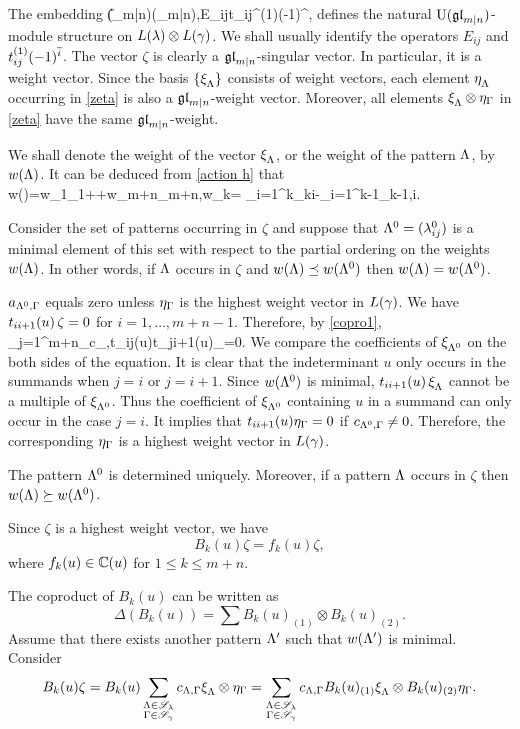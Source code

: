 \documentclass[12pt]{amsart}
\begin{document}
The embedding
\U(\gl_{m|n})\hookrightarrow\Y(\gl_{m|n}),\qquad E_{ij}\mapsto t_{ij}^{(1)}(-1)^{},
\eeq
defines the natural
${\rm U}(\mathfrak{gl}_{m|n})$-module  structure
on $L(\lambda)\otimes L(\gamma)$. We shall usually identify the operators
$E_{ij}$ and $t_{ij}^{(1)}(-1)^{\overline{i}}$.
The vector $\zeta$ is clearly a $\mathfrak{gl}_{m|n}$-singular vector. In particular,
it is a weight vector. Since the basis $\{\xi^{}_{\Lambda}\}$ consists of
weight vectors, each element $\eta^{}_{\Lambda}$ occurring in \eqref{zeta} is also
a $\mathfrak{gl}_{m|n}$-weight vector. Moreover, all elements $\xi^{}_{\Lambda}\otimes\eta_{\Gamma}$ in \eqref{zeta} have
the same $\mathfrak{gl}_{m|n}$-weight.

We shall denote the weight of the vector $\xi^{}_{\Lambda}$, or the weight
of the pattern $\Lambda$, by $w(\Lambda)$.
It can be deduced from \eqref{action h} that
w(\La)=w_1\ve_1+\cdots+w_{m+n}\ve_{m+n},\qquad w_k=
\sum_{i=1}^k\la_{ki}-\sum_{i=1}^{k-1}\la_{k-1,i}.
\eeq

Consider the set of patterns occurring in $\zeta$
and suppose that $\Lambda^0=(\lambda_{ij}^0)$ is a minimal element of this set with respect to the
partial ordering on the weights $w(\Lambda)$. In other words, if $\Lambda$ occurs in $\zeta$
and $w(\Lambda)\preceq w(\Lambda^0)$
then $w(\Lambda)=w(\Lambda^0)$.

\ble\label{lem:ga0}
$a_{\Lambda^0,\Gamma}$ equals zero unless $\eta_{\Gamma}$ is the highest weight vector in $L(\gamma)$.
\ele
\bpf
We have $t_{ii+1}(u)\,\zeta=0$ for $i=1,\dots,m+n-1$. Therefore, by
\eqref{copro1},
\sum_{j=1}^{m+n}\sum_{}c_{\La,\Ga}t_{ij}(u)\xiL\ot t_{ji+1}(u)\eta_{\Ga}=0.
\eeq
We compare the coefficients of $\xi^{}_{\Lambda^0}$ on the both sides of the equation. It is clear that the indeterminant $u$  only occurs in the summands when $j=i$ or $j=i+1$. Since $w(\Lambda^0)$ is minimal, $t_{ii+1}(u)\,\xi^{}_{\Lambda}$ cannot be a multiple of $\xi^{}_{\Lambda^0}$. Thus the coefficient of $\xi^{}_{\Lambda^0}$ containing $u$ in a summand can only occur in the case  $j=i$. It implies that $t_{ii+1}(u)\eta_{\Gamma}=0$ if $c_{\Lambda^0,\Gamma}\neq 0$. Therefore, the corresponding $\eta_{\Gamma}$ is a highest weight vector in $L(\gamma)$.
\epf

\ble\label{lem:uni}
The pattern $\Lambda^0$ is determined uniquely.
Moreover, if a pattern $\Lambda$ occurs in $\zeta$
then $w(\Lambda)\succeq w(\Lambda^0)$.
\ele
\bpf

Since $\zeta$ is a highest weight vector, we have
\[
B_k(u)\zeta=f_k(u)\zeta,
\]
where $f_k(u)\in \mathbb{C}(u)$ for $1\leq k\leq m+n$.

The coproduct of $B_k(u)$ can be written as
\[
\Delta(B_k(u))=\sum B_k(u)_{(1)}\otimes B_k(u)_{(2)}.
\]
Assume that there exists another pattern $\Lambda'$ such that $w(\Lambda')$ is  minimal.
Consider
\[
B_k(u)\zeta=B_k(u)\sum_{\substack{\Lambda\in\mathscr{S}_{\lambda}\\ \Gamma\in\mathscr{S}_{\gamma}}}c_{\Lambda,\Gamma}\xi^{}_{\Lambda}\otimes \eta_{\Gamma}=\sum_{\substack{\Lambda\in\mathscr{S}_{\lambda}\\ \Gamma\in\mathscr{S}_{\gamma}}}c_{\Lambda,\Gamma}B_k(u)_{(1)}\xi^{}_{\Lambda}\otimes B_k(u)_{(2)}\eta_{\Gamma}.
\]
\end{document}

